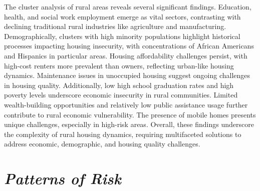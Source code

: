 The cluster analysis of rural areas reveals several significant findings. Education, health, and social work employment emerge as vital sectors, contrasting with declining traditional rural industries like agriculture and manufacturing. Demographically, clusters with high minority populations highlight historical processes impacting housing insecurity, with concentrations of African Americans and Hispanics in particular areas. Housing affordability challenges persist, with high-cost renters more prevalent than owners, reflecting urban-like housing dynamics. Maintenance issues in unoccupied housing suggest ongoing challenges in housing quality. Additionally, low high school graduation rates and high poverty levels underscore economic insecurity in rural communities. Limited wealth-building opportunities and relatively low public assistance usage further contribute to rural economic vulnerability. The presence of mobile homes presents unique challenges, especially in high-risk areas. Overall, these findings underscore the complexity of rural housing dynamics, requiring multifaceted solutions to address economic, demographic, and housing quality challenges.

\section{\textit{Patterns of Risk}}

